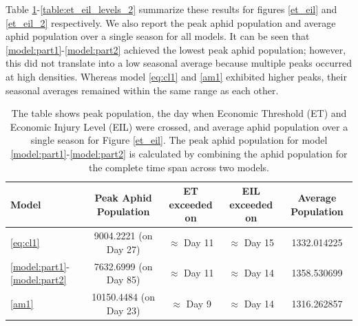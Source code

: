 \documentclass[sn-mathphys-num]{sn-jnl}
\numberwithin{equation}{section}
\numberwithin{equation}{section}
\begin{document}
 
Table \ref{table:et_eil_levels}-\ref{table:et_eil_levels_2} summarize these results for figures \ref{et_eil} and \ref{et_eil_2} respectively.  We also report the peak aphid population and average aphid population over a single season for all models. It can be seen that \eqref{model:part1}-\eqref{model:part2} achieved the lowest peak aphid population; however, this did not translate into a low seasonal average because multiple peaks occurred at high densities. Whereas model \eqref{eq:cl1} and \eqref{am1} exhibited higher peaks, their seasonal averages remained within the same range as each other. 
\begin{table}
 \centering
\begin{tabular}{|l|c|c|c|c|}
\hline
\textbf{Model} & \textbf{Peak Aphid Population } & \textbf{ET exceeded on} & \textbf{EIL exceeded on} & \textbf{Average Population} \\
\hline
\eqref{eq:cl1}  & 9004.2221 (on Day 27)  & $\approx$ Day 11 & $\approx$ Day 15 & 1332.014225\\
 \hline
\eqref{model:part1}-\eqref{model:part2}& 7632.6999 (on Day 85)  & $\approx$ Day 11 &  $\approx$ Day 14 & 1358.530699 \\
 \hline
\eqref{am1} & 10150.4484 (on Day 23)  & $\approx$ Day 9 &  $\approx$ Day 14 & 1316.262857
 \\
\hline
\end{tabular}
\caption{ The table shows peak population, the day when Economic Threshold (ET) and Economic Injury Level (EIL) were crossed, and average aphid population over a single season for Figure \ref{et_eil}. The peak aphid population for model \eqref{model:part1}-\eqref{model:part2} is calculated by combining the aphid population for the complete time span across two models. }
\label{table:et_eil_levels}
\end{table}
\end{document}
